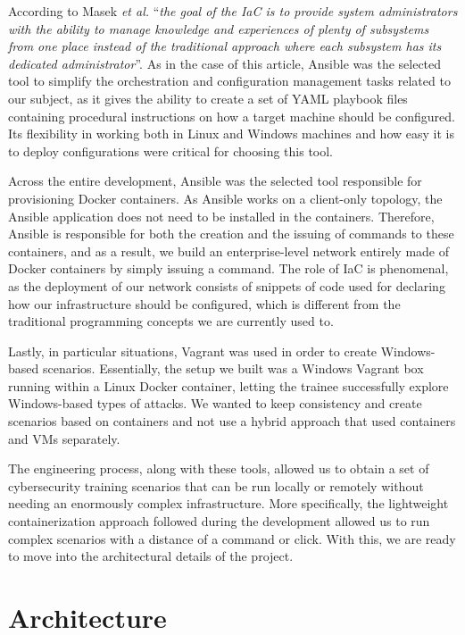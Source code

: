 According to Masek \textit{et al.} \cite{unleashing_full_potential_of_ansible_ref} ``\textit{the goal of the IaC is to provide system administrators with the ability to manage knowledge and experiences of plenty of subsystems from one place instead of the traditional approach where each subsystem has its dedicated administrator}''. As in the case of this article, Ansible was the selected tool to simplify the orchestration and configuration management tasks related to our subject, as it gives the ability to create a set of YAML playbook files containing procedural instructions on how a target machine should be configured. Its flexibility in working both in Linux and Windows machines and how easy it is to deploy configurations were critical for choosing this tool.

Across the entire development, Ansible was the selected tool responsible for provisioning Docker containers. As Ansible works on a client-only topology, the Ansible application does not need to be installed in the containers. Therefore, Ansible is responsible for both the creation and the issuing of commands to these containers, and as a result, we build an enterprise-level network entirely made of Docker containers by simply issuing a command. The role of IaC is phenomenal, as the deployment of our network consists of snippets of code used for declaring how our infrastructure should be configured, which is different from the traditional programming concepts we are currently used to.

Lastly, in particular situations, Vagrant was used in order to create Windows-based scenarios. Essentially, the setup we built was a Windows Vagrant box running within a Linux Docker container, letting the trainee successfully explore Windows-based types of attacks. We wanted to keep consistency and create scenarios based on containers and not use a hybrid approach that used containers and VMs separately.

The engineering process, along with these tools, allowed us to obtain a set of cybersecurity training scenarios that can be run locally or remotely without needing an enormously complex infrastructure. More specifically, the lightweight containerization approach followed during the development allowed us to run complex scenarios with a distance of a command or click. With this, we are ready to move into the architectural details of the project.

\section{Architecture} \label{sec:validation_architecture}

